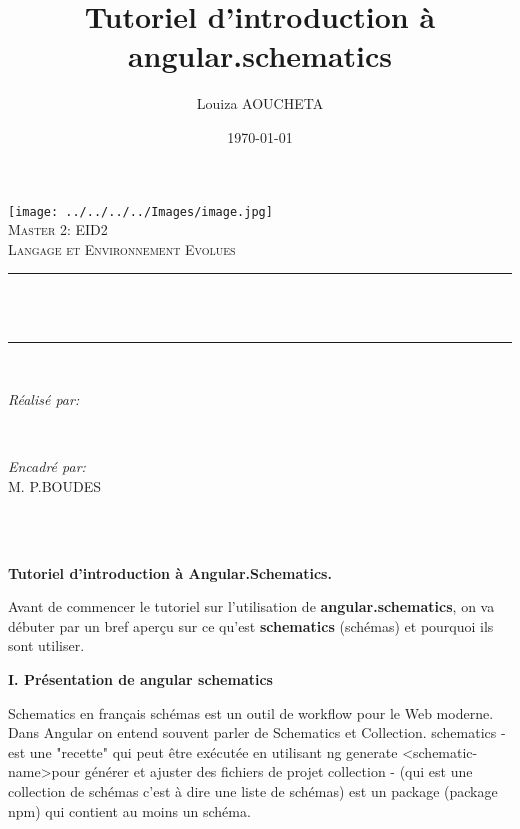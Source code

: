 \documentclass[12pt,french]{article}
\title{Tutoriel d'introduction à angular.schematics}
\author{Louiza AOUCHETA}
\date{\today}
\makeatletter
\let\thetitle\@title
\let\theauthor\@author
\let\thedate\@date
\makeatother
\begin{document}

\begin{titlepage}
\centering 
\texttt{[image: ../../../../Images/image.jpg]} \\
    \vspace*{0.5 cm}
    \textsc{\LARGE Master 2: EID2}\\[2.0 cm]	
	\textsc{\large Langage et Environnement Evolues}\\[0.5 cm]				%
	\rule{\linewidth}{0.2 mm} \\[0.4 cm]
	{ \huge \bfseries \thetitle}\\
	\rule{\linewidth}{0.2 mm} \\[1.5 cm]
	
	\begin{minipage}{0.4\textwidth}
		\begin{flushleft} \large
			\emph{Réalisé par:}\\
			\theauthor
			\end{flushleft}
			\end{minipage}~
			\begin{minipage}{0.4\textwidth}
			\begin{flushright} \large
			\emph{Encadré par:} \\
			M. P.BOUDES									%
		\end{flushright}
	\end{minipage}\\[2 cm]
	
	{\large \thedate}\\[2 cm]
 
	\vfill
	
\end{titlepage}

		\qquad\qquad\qquad\large{\textbf{Tutoriel d’introduction à Angular.Schematics.}}\newline
	
	Avant de commencer le tutoriel sur l'utilisation de \textbf{angular.schematics}, on va débuter par un bref aperçu sur ce qu'est \textbf{schematics} (schémas) et pourquoi ils sont utiliser.\newline
	
	\textbf{I. Présentation de angular schematics}\newline
	
	Schematics en français schémas est un outil de workflow pour le Web moderne.\newline
	Dans Angular on entend souvent parler de Schematics et Collection.\smallbreak
	schematics - est une "recette" qui peut être exécutée en utilisant ng generate <schematic-name>pour générer et ajuster des fichiers de projet\smallbreak
	collection - (qui est une collection de schémas c'est à dire une liste de schémas) est un package (package npm) qui contient au moins un schéma.\newline
	
\end{document}

